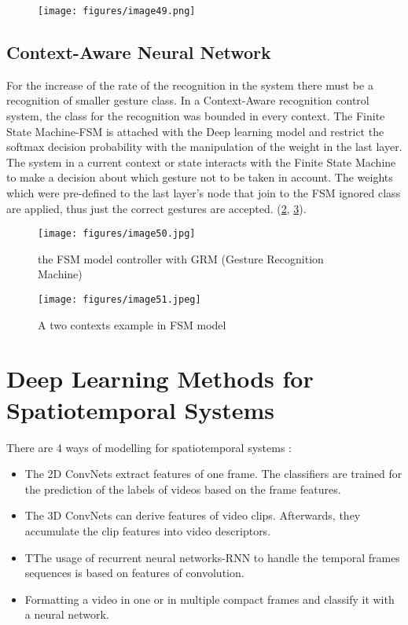 \documentclass[12pt]{book}
\begin{document}
\begin{figure}[!htbp]
\centering
  \texttt{[image: figures/image49.png]}
  \\
  \caption{\cite{NOO2019}}
  \label{fig:fig25}
\end{figure}

\section{Context-Aware Neural Network}
For the increase of the rate of the recognition in the system there must be a recognition of smaller gesture class. In a Context-Aware recognition control system, the class for the recognition was bounded in every context. The Finite State Machine-FSM is attached with the Deep learning model and restrict the softmax decision probability with the manipulation of the weight in the last layer. The system in a current context or state interacts with the Finite State Machine to make a decision about which gesture not to be taken in account. The weights which were pre-defined to the last layer’s node that join to the FSM ignored class are applied, thus just the correct gestures are accepted. (\ref{fig:fig26}, \ref{fig:fig27}). 

\begin{figure}[!htbp]
\centering
  \texttt{[image: figures/image50.jpg]}
  \\
  \caption{the FSM model controller with GRM (Gesture Recognition Machine) \cite{NOO2019}}
  \label{fig:fig26}
\end{figure}

\begin{figure}[!htbp]
\centering
  \texttt{[image: figures/image51.jpeg]}
  \\
  \caption{A two contexts example  in FSM model \cite{NOO2019}}
  \label{fig:fig27}
\end{figure}

\chapter{Deep Learning Methods for Spatiotemporal Systems}
There are 4 ways of modelling for spatiotemporal systems \cite{EGO2018}:
\begin{itemize}
    \item The 2D ConvNets extract features of one frame. The classifiers are trained for the prediction of the labels of videos based on the frame features.

\item The 3D ConvNets can derive features of video clips. Afterwards, they accumulate the clip features into video descriptors. 

\item TThe  usage of recurrent neural networks-RNN to handle the temporal frames sequences is based on features of convolution. 

\item Formatting a video in one or in multiple compact frames and classify it with a neural network. 
\end{itemize}
\end{document}
